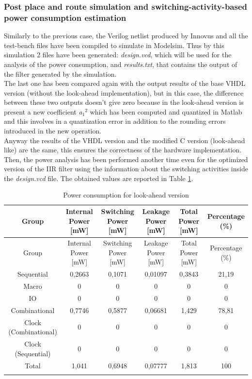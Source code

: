 \documentclass[a4paper, titlepage]{article}
\begin{document}
\subsubsection{Post place and route simulation and switching-activity-based power consumption estimation}
Similarly to the previous case, the Verilog netlist produced by Innovus and all the test-bench files have been compiled to simulate in Modelsim. Thus by this simulation 2 files have been generated: \textit{design.vcd}, which will be used for the analysis of the power consumption, and \textit{results.txt}, that contains the output of the filter generated by the simulation.\\ The last one has been compared again with the output results of the base VHDL version (without the look-ahead implementation), but in this case, the difference between these two outputs doesn't give zero because in the look-ahead version is present a new coefficient \textit{a$_1${$^2$}} which has been computed and quantized in Matlab and this involves in a quantization error in addition to the rounding errors introduced in the new operation.
\\ Anyway the results of the VHDL version and the modified C version (look-ahead like) are the same, this ensures the correctness of the hardware implementation.
\\Then, the power analysis has been performed another time even for the optimized version of the IIR filter using the information about the switching activities inside the \textit{design.vcd} file. The obtained values are reported in Table \ref{tab:tot power LA}.
\begin{longtable}{*6c}
\caption{Power consumption for look-ahead version}
\label{tab:tot power LA}\\
\toprule
Group & \thead{Internal\\Power [mW]} & \thead{Switching\\Power [mW]} & \thead{Leakage\\Power [mW]} & \thead{Total\\Power  [mW]}& \thead{Percentage\\(\%)}\\
\midrule
\endfirsthead
Group & \thead{Internal\\Power [mW]} & \thead{Switching\\Power [mW]} & \thead{Leakage\\Power [mW]} & \thead{Total\\Power  [mW]}& \thead{Percentage\\(\%)}\\
\midrule
\endhead
\midrule
\endfoot
Sequential & 0,2663 & 0,1071 & 0,01097 & 0,3843 & 21,19 \\
Macro & 0 & 0 & 0 & 0 & 0\\
IO & 0 & 0 & 0 & 0 & 0\\
Combinational & 0,7746 & 0,5877 & 0,06681 & 1,429 & 78,81\\
Clock (Combinational) & 0 & 0 & 0 & 0 & 0\\
Clock (Sequential) & 0 & 0 & 0 & 0 & 0\\
\bottomrule
Total & 1,041 & 0,6948 & 0,07777 & 1,813 & 100\\
\endlastfoot
\end{longtable}
\end{document}
